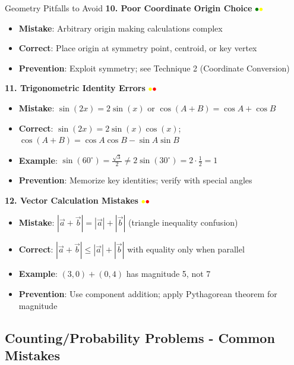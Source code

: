 \documentclass{article}
\begin{document}
\begin{trapbox}{Geometry Pitfalls to Avoid}
\textbf{10. Poor Coordinate Origin Choice} \textcolor{green}{$\bullet$}\textcolor{yellow}{$\bullet$}
\begin{itemize}[nosep]
\item \textbf{Mistake}: Arbitrary origin making calculations complex
\item \textbf{Correct}: Place origin at symmetry point, centroid, or key vertex
\item \textbf{Prevention}: Exploit symmetry; see Technique 2 (Coordinate Conversion)
\end{itemize}

\textbf{11. Trigonometric Identity Errors} \textcolor{yellow}{$\bullet$}\textcolor{red}{$\bullet$}
\begin{itemize}[nosep]
\item \textbf{Mistake}: $\sin(2x) = 2\sin(x)$ or $\cos(A+B) = \cos A + \cos B$
\item \textbf{Correct}: $\sin(2x) = 2\sin(x)\cos(x)$; $\cos(A+B) = \cos A \cos B - \sin A \sin B$
\item \textbf{Example}: $\sin(60^\circ) = \frac{\sqrt{3}}{2} \neq 2\sin(30^\circ) = 2 \cdot \frac{1}{2} = 1$
\item \textbf{Prevention}: Memorize key identities; verify with special angles
\end{itemize}

\textbf{12. Vector Calculation Mistakes} \textcolor{yellow}{$\bullet$}\textcolor{red}{$\bullet$}
\begin{itemize}[nosep]
\item \textbf{Mistake}: $|\vec{a} + \vec{b}| = |\vec{a}| + |\vec{b}|$ (triangle inequality confusion)
\item \textbf{Correct}: $|\vec{a} + \vec{b}| \leq |\vec{a}| + |\vec{b}|$ with equality only when parallel
\item \textbf{Example}: $(3,0) + (0,4)$ has magnitude 5, not 7
\item \textbf{Prevention}: Use component addition; apply Pythagorean theorem for magnitude
\end{itemize}
\end{trapbox}

\subsection{Counting/Probability Problems - Common Mistakes}
\end{document}
